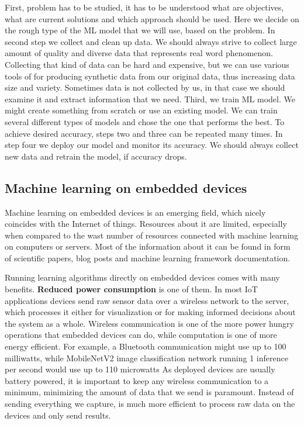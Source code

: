 First, problem has to be studied, it has to be understood what are objectives, what are current solutions and which approach should be used. 
Here we decide on the rough type of the ML model that we will use, based on the problem.
In second step we collect and clean up data.
We should always strive to collect large amount of quality and diverse data that represents real word phenomenon.
Collecting that kind of data can be hard and expensive, but we can use various tools of for producing synthetic data from our original data, thus increasing data size and variety.
Sometimes data is not collected by us, in that case we should examine it and extract information that we need.
Third, we train ML model.
We might create something from scratch or use an existing model. 
We can train several different types of models and chose the one that performs the best.
To achieve desired accuracy, steps two and three can be repeated many times.
In step four we deploy our model and monitor its accuracy. 
We should always collect new data and retrain the model, if accuracy drops.


\subsection{ Machine learning on embedded devices} \label{ml_on_embedded}

Machine learning on embedded devices is an emerging field, which nicely coincides with the Internet of things.
Resources about it are limited, especially when compared to the wast number of resources connected with machine learning on computers or servers.
Most of the information about it can be found in form of scientific papers, blog posts and machine learning framework documentation\cite{hello_edge}\cite{tflite_risc-v}\cite{pete_tiny}.

Running learning algorithms directly on embedded devices comes with many benefits.
\textbf{Reduced power consumption} is one of them.
In most IoT applications devices send raw sensor data over a wireless network to the server, which processes it either for visualization or for making informed decisions about the system as a whole. 
Wireless communication is one of the more power hungry operations that embedded devices can do, while computation is one of more energy efficient\cite{pete_tiny}.
For example, a Bluetooth communication might use up to 100 milliwatts, while MobileNetV2 image classification network running 1 inference per second would use up to 110 microwatts\cite{pete_tiny}
As deployed devices are usually battery powered, it is important to keep any wireless communication to a minimum, minimizing the amount of data that we send is paramount.
Instead of sending everything we capture, is much more efficient to process raw data on the devices and only send results.

